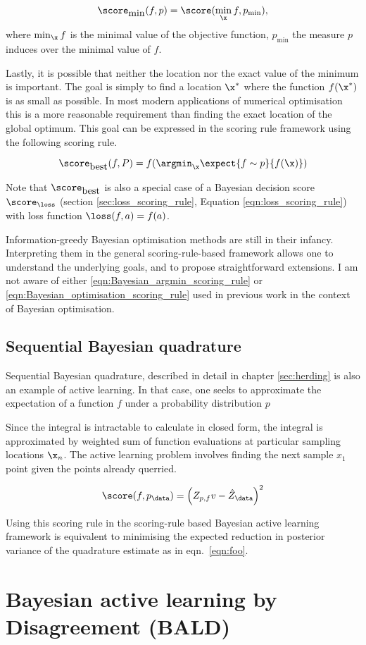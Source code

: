\begin{equation}
	\score_{\mbox{min}}(f,p) = \score(\min_{\x}f,p_{\min}), \label{eqn:Bayesian_argmin_scoring_rule}
\end{equation}
where $\min_{\x}f$ is the minimal value of the objective function, $p_{\min}$ the measure $p$ induces over the minimal value of $f$.

Lastly, it is possible that neither the location nor the exact value of the minimum is important. The goal is simply to find a location $\x^{*}$ where the function $f(\x^{*})$ is as small as possible. In most modern applications of numerical optimisation this is a more reasonable requirement than finding the exact location of the global optimum. This goal can be expressed in the scoring rule framework using the following scoring rule.

\begin{equation}
	\score_{\mbox{best}}(f,P) = f(\argmin_{\x}\expect{f\sim p}{f(\x)}) \label{eqn:Bayesian_optimisation_scoring_rule}
\end{equation}

Note that $\score_{\mbox{best}}$ is also a special case of a Bayesian decision score $\score_{\loss}$ (section \ref{sec:loss_scoring_rule}, Equation \eqref{eqn:loss_scoring_rule}) with loss function $\loss(f,a)=f(a)$.


Information-greedy Bayesian optimisation methods are still in their infancy. Interpreting them in the general scoring-rule-based framework allows one to understand the underlying goals, and to propose straightforward extensions. I am not aware of either \eqref{eqn:Bayesian_argmin_scoring_rule} or \eqref{eqn:Bayesian_optimisation_scoring_rule} used in previous work in the context of Bayesian optimisation.

\subsection{Sequential Bayesian quadrature}

Sequential Bayesian quadrature, described in detail in chapter \ref{sec:herding} is also an example of active learning. In that case, one seeks to approximate the expectation of a function $f$ under a probability distribution $p$

Since the integral is intractable to calculate in closed form, the integral is approximated by weighted sum of function evaluations at particular sampling locations $\x_n$. The active learning problem involves finding the next sample $x_1$ point given the points already querried.

\begin{equation}
	\score(f,p_\data) = \left(Z_{p,f}v - \hat{Z}_\data \right)^2
\end{equation}

Using this scoring rule in the scoring-rule based Bayesian active learning framework is equivalent to minimising the expected reduction in posterior variance of the quadrature estimate as in eqn.\ \eqref{eqn:foo}.

\section{Bayesian active learning by Disagreement (BALD)}